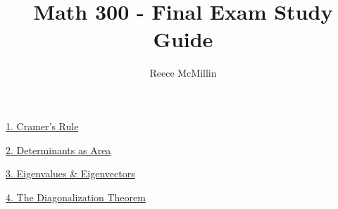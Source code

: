 
\usepackage{systeme}
\usepackage{color, colortbl}
\usepackage{graphicx}
\usepackage{hyperref}
\hypersetup{
    colorlinks,
    citecolor=black,
    filecolor=black,
    linkcolor=black,
    urlcolor=black
}
\graphicspath{ {/} }
\title{Math 300 - Final Exam Study Guide}
\author{Reece McMillin}

\maketitle
\tableofcontents
\large
\hyperlink{cramer}{1. Cramer's Rule}

\hyperlink{detarea}{2. Determinants as Area}

\hyperlink{eigen}{3. Eigenvalues \& Eigenvectors}

\hyperlink{diag}{4. The Diagonalization Theorem}

